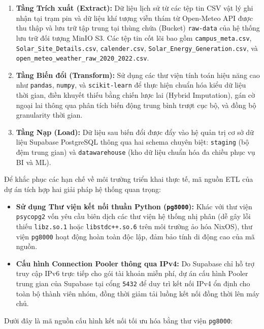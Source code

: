 \documentclass[12pt,a4paper]{article}
\begin{document}
\begin{enumerate}
    \item \textbf{Tầng Trích xuất (Extract):} Dữ liệu lịch sử từ các tệp tin CSV vật lý ghi nhận tại trạm pin và dữ liệu khí tượng viễn thám từ Open-Meteo API được thu thập và lưu trữ tập trung tại thùng chứa (Bucket) \texttt{raw-data} của hệ thống lưu trữ đối tượng MinIO S3. Các tệp tin cốt lõi bao gồm \texttt{campus\_meta.csv}, \texttt{Solar\_Site\_Details.csv}, \texttt{calender.csv}, \texttt{Solar\_Energy\_Generation.csv}, và \texttt{open\_meteo\_weather\_raw\_2020\_2022.csv}.
    \item \textbf{Tầng Biến đổi (Transform):} Sử dụng các thư viện tính toán hiệu năng cao như \texttt{pandas}, \texttt{numpy}, và \texttt{scikit-learn} để thực hiện chuẩn hóa kiểu dữ liệu thời gian, điền khuyết thiếu bằng chiến lược lai (Hybrid Imputation), gán cờ ngoại lai thông qua phân tích biến động trung bình trượt cục bộ, và đồng bộ granularity thời gian.
    \item \textbf{Tầng Nạp (Load):} Dữ liệu sau biến đổi được đẩy vào hệ quản trị cơ sở dữ liệu Supabase PostgreSQL thông qua hai schema chuyên biệt: \texttt{staging} (bộ đệm trung gian) và \texttt{datawarehouse} (kho dữ liệu chuẩn hóa đa chiều phục vụ BI và ML).
\end{enumerate}

Để khắc phục các hạn chế về môi trường triển khai thực tế, mã nguồn ETL của dự án tích hợp hai giải pháp hệ thống quan trọng:
\begin{itemize}
    \item \textbf{Sử dụng Thư viện kết nối thuần Python (\texttt{pg8000}):} Khác với thư viện \texttt{psycopg2} vốn yêu cầu biên dịch các thư viện hệ thống nhị phân  (dễ gây lỗi thiếu \texttt{libz.so.1} hoặc \texttt{libstdc++.so.6} trên môi trường ảo hóa NixOS), thư viện \texttt{pg8000} hoạt động hoàn toàn độc lập, đảm bảo tính di động cao của mã nguồn.
    \item \textbf{Cấu hình Connection Pooler thông qua IPv4:} Do Supabase chỉ hỗ trợ truy cập IPv6 trực tiếp cho gói tài khoản miễn phí, dự án cấu hình Pooler trung gian của Supabase tại cổng \texttt{5432} để duy trì kết nối IPv4 ổn định cho toàn bộ thành viên nhóm, đồng thời giảm tải luồng kết nối đồng thời lên máy chủ.
\end{itemize}

Dưới đây là mã nguồn cấu hình kết nối tối ưu hóa bằng thư viện \texttt{pg8000}:
\end{document}
